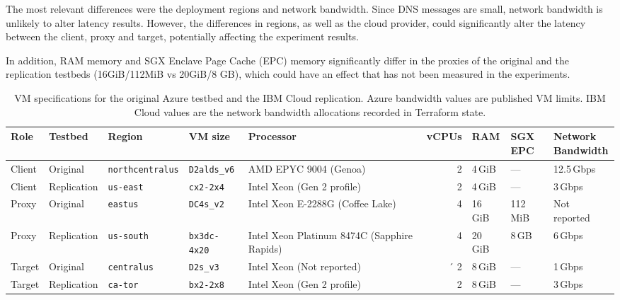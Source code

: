 \documentclass[a4paper]{article}
\begin{document}
The most relevant differences were the deployment regions and network bandwidth. Since DNS messages are small, network bandwidth is unlikely to alter latency results. However, the differences in regions, as well as the cloud provider, could significantly alter the latency between the client, proxy and target, potentially affecting the experiment results.

In addition, RAM memory and SGX Enclave Page Cache (EPC) memory significantly differ in the proxies of the original and the replication testbeds (16GiB/112MiB vs 20GiB/8 GB), which could have an effect that has not been measured in the experiments.

\begin{table}[H]
	\centering
	\small
	\setlength{\tabcolsep}{3pt}
	\begin{tabularx}{\linewidth}{@{}llll>{\raggedright\arraybackslash}Xrlll@{}}
		\toprule
		Role & Testbed & Region & VM size & Processor & vCPUs & RAM &
		\shortstack[l]{SGX\\EPC} & \shortstack[l]{Network\\Bandwidth} \\
		\midrule
		Client & Original & \texttt{northcentralus} &
		\texttt{D2alds\_v6} & AMD EPYC 9004 (Genoa) &
		2 & 4\,GiB & --- & 12.5\,Gbps \\
		Client & Replication & \texttt{us-east} &
		\texttt{cx2-2x4} & Intel Xeon (Gen 2 profile) &
		2 & 4\,GiB & --- & 3\,Gbps \\
		\addlinespace
		Proxy & Original & \texttt{eastus} &
		\texttt{DC4s\_v2} & Intel Xeon E-2288G (Coffee Lake) &
		4 & 16\,GiB & 112\,MiB & Not reported \\
		Proxy & Replication & \texttt{us-south} &
		\texttt{bx3dc-4x20} & Intel Xeon Platinum 8474C (Sapphire Rapids) &
		4 & 20\,GiB & 8\,GB & 6\,Gbps \\
		\addlinespace
		Target & Original & \texttt{centralus} &
		\texttt{D2s\_v3} & Intel Xeon (Not reported) &´
		2 & 8\,GiB & --- & 1\,Gbps \\
		Target & Replication & \texttt{ca-tor} &
		\texttt{bx2-2x8} & Intel Xeon (Gen 2 profile) &
		2 & 8\,GiB & --- & 3\,Gbps \\
		\bottomrule
	\end{tabularx}
	\caption{VM specifications for the original Azure testbed and the IBM Cloud
		replication. Azure bandwidth values are published VM limits. IBM Cloud
		values are the network bandwidth allocations recorded in Terraform state.}
	\label{tab:vm-testbeds}
\end{table}
\end{document}
